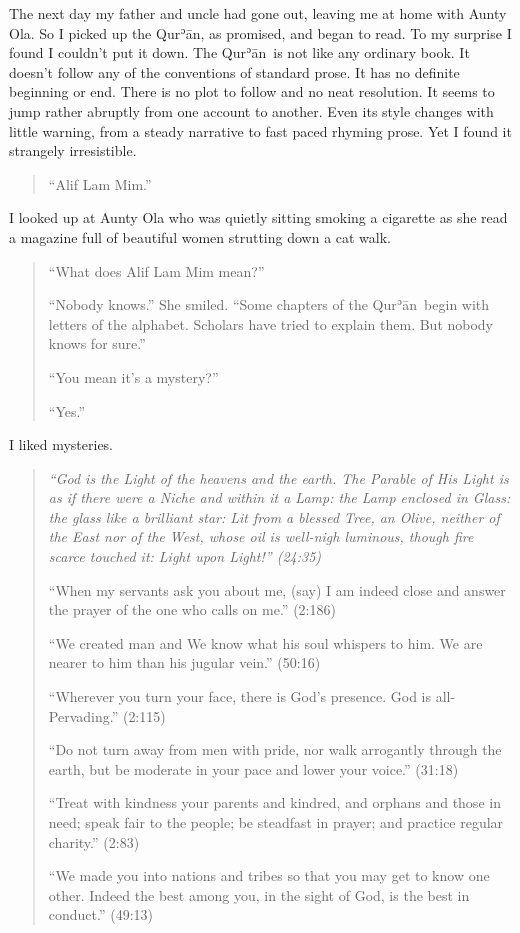 \documentclass[12pt]{memoir}
\def\´{ʾ} %
\def \Quran{Qur\-\´ān} %
\newcommand{\QRef}[1]{{\color{darkblue}#1}}
\begin{document}
The next day my father and uncle had gone out,
leaving me at home with Aunty Ola.
So I picked up the \Quran, as promised, and began to read.
To my surprise I found I couldn’t put it down.
The \Quran\ is not like any ordinary book.
It doesn’t follow any of the conventions of standard prose.
It has no definite beginning or end.
There is no plot to follow and no neat resolution.
It seems to jump rather abruptly from one account to another.
Even its style changes with little warning,
from a steady narrative to fast paced rhyming prose.
Yet I found it strangely irresistible.

\begin{quote}
“Alif Lam Mim.”
\end{quote}

I looked up at Aunty Ola who was quietly sitting smoking a cigarette
as she read a magazine full of beautiful women strutting down a cat walk.

\begin{quote}
“What does Alif Lam Mim mean?”

“Nobody knows.” She smiled.
“Some chapters of the \Quran\ begin with letters of the alphabet.
Scholars have tried to explain them.
But nobody knows for sure.”

“You mean it’s a mystery?”

“Yes.”
\end{quote}

I liked mysteries.

\begin{quote}
\itshape
“God is the Light of the heavens and the earth.
The Parable of His Light is as if there were a Niche and within it a Lamp:
the Lamp enclosed in Glass: the glass like a brilliant star:
Lit from a blessed Tree, an Olive, neither of the East nor of the West,
whose oil is well-nigh luminous,
though fire scarce touched it: Light upon Light!” (\QRef{24:35})

“When my servants ask you about me, (say)
I am indeed close and answer the prayer of the one who calls on me.”
(\QRef{2:186})

“We created man and We know what his soul whispers to him.
We are nearer to him than his jugular vein.” (\QRef{50:16})

“Wherever you turn your face, there is God’s presence.
God is all-Pervading.” (\QRef{2:115})

“Do not turn away from men with pride, nor walk arrogantly through the earth,
but be moderate in your pace and lower your voice.” (\QRef{31:18})

“Treat with kindness your parents and kindred, and orphans and those in need;
speak fair to the people; be steadfast in prayer;
and practice regular charity.” (\QRef{2:83})

“We made you into nations and tribes so that you may get to know one other.
Indeed the best among you, in the sight of God, is the best in conduct.”
(\QRef{49:13})
\end{quote}
\end{document}
